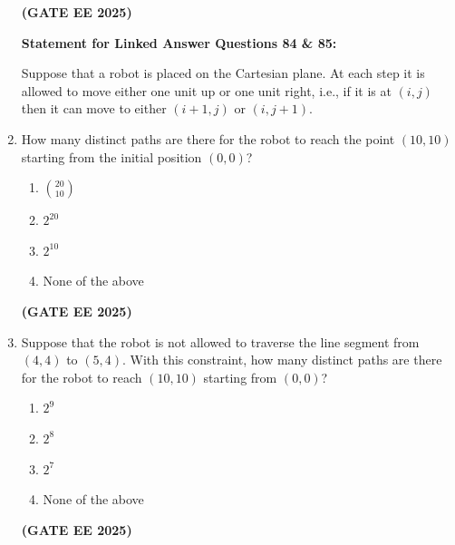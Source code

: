 \documentclass[journal,12pt,onecolumn]{IEEEtran}
\theoremstyle{remark}
\begin{document}
\begin{enumerate}
\begin{enumerate}
    \end{enumerate}
 \hfill \textbf{(GATE EE 2025)}

\textbf{Statement for Linked Answer Questions 84 \& 85:}  

Suppose that a robot is placed on the Cartesian plane. At each step it is allowed to move either one unit up or one unit right, i.e., if it is at $(i,j)$ then it can move to either $(i+1,j)$ or $(i,j+1)$.


    
    \item How many distinct paths are there for the robot to reach the point $(10,10)$ starting from the initial position $(0,0)$?
    \begin{enumerate}
        \item $\binom{20}{10}$
        \item $2^{20}$
        \item $2^{10}$
        \item None of the above
    \end{enumerate}
\hfill \textbf{(GATE EE 2025)}
    \item Suppose that the robot is not allowed to traverse the line segment from $(4,4)$ to $(5,4)$. With this constraint, how many distinct paths are there for the robot to reach $(10,10)$ starting from $(0,0)$?
    \begin{enumerate}
        \item $2^{9}$
        \item $2^{8}$
        \item $2^{7}$
        \item None of the above
    \end{enumerate}
\hfill \textbf{(GATE EE 2025)}
\end{enumerate}
\end{document}

